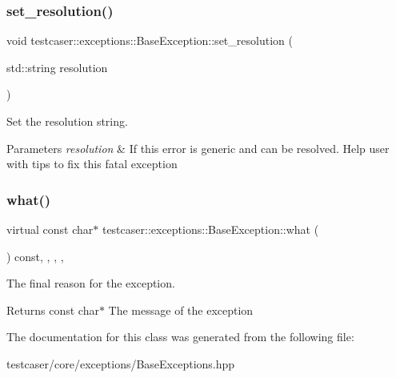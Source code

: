\subsubsection{\texorpdfstring{set\+\_\+resolution()}{set\_resolution()}}
{\footnotesize\ttfamily void testcaser\+::exceptions\+::\+Base\+Exception\+::set\+\_\+resolution (\begin{DoxyParamCaption}\item[{std\+::string}]{resolution }\end{DoxyParamCaption})\hspace{0.3cm}{\ttfamily [inline]}}



Set the resolution string. 


\begin{DoxyParams}{Parameters}
{\em resolution} & If this error is generic and can be resolved. Help user with tips to fix this fatal exception \\
\hline
\end{DoxyParams}
\mbox{\label{classtestcaser_1_1exceptions_1_1BaseException_a76d41683a93c7c45cd446ee161344f05}} 
\subsubsection{\texorpdfstring{what()}{what()}}
{\footnotesize\ttfamily virtual const char$\ast$ testcaser\+::exceptions\+::\+Base\+Exception\+::what (\begin{DoxyParamCaption}{ }\end{DoxyParamCaption}) const\hspace{0.3cm}{\ttfamily [inline]}, {\ttfamily [final]}, {\ttfamily [override]}, {\ttfamily [virtual]}, {\ttfamily [noexcept]}}



The final reason for the exception. 

\begin{DoxyReturn}{Returns}
const char$\ast$ The message of the exception 
\end{DoxyReturn}


The documentation for this class was generated from the following file\+:\begin{DoxyCompactItemize}
\item 
testcaser/core/exceptions/Base\+Exceptions.\+hpp\end{DoxyCompactItemize}
